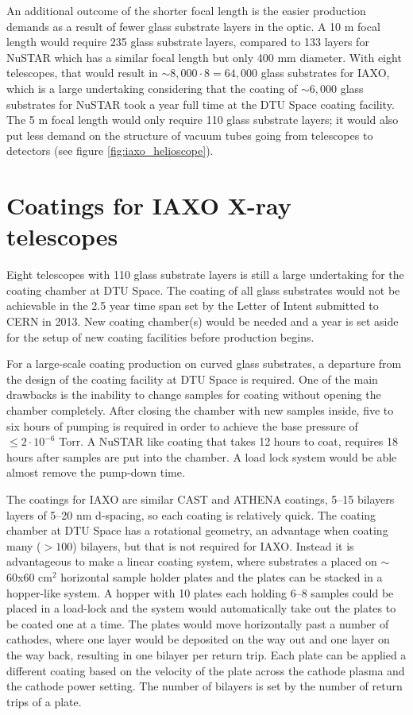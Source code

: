 An additional outcome of the shorter focal length is the easier production demands as a result of fewer glass substrate layers in the optic. A 10 m focal length would require 235 glass substrate layers, compared to 133 layers for NuSTAR which has a similar focal length but only 400 mm diameter. With eight telescopes, that would result in $\sim8,000\cdot8=64,000$ glass substrates for IAXO, which is a large undertaking considering that the coating of $\sim6,000$ glass substrates for NuSTAR took a year full time at the DTU Space coating facility. The 5 m focal length would only require 110 glass substrate layers; it would also put less demand on the structure of vacuum tubes going from telescopes to detectors (see figure \ref{fig:iaxo_helioscope}).

\section{Coatings for IAXO X-ray telescopes}
Eight telescopes with 110 glass substrate layers is still a large undertaking for the coating chamber at DTU Space. The coating of all glass substrates would not be achievable in the 2.5 year time span set by the Letter of Intent\cite{Irastorza:2013uu} submitted to CERN in 2013. New coating chamber(s) would be needed and a year is set aside for the setup of new coating facilities before production begins.

For a large-scale coating production on curved glass substrates, a departure from the design of the coating facility at DTU Space is required. One of the main drawbacks is the inability to change samples for coating without opening the chamber completely. After closing the chamber with new samples inside, five to six hours of pumping is required in order to achieve the base pressure of $\leq 2\cdot10^{-6}$ Torr. A NuSTAR like coating that takes 12 hours to coat, requires 18 hours after samples are put into the chamber. A load lock system would be able almost remove the pump-down time.

The coatings for IAXO are similar CAST and ATHENA coatings, 5--15 bilayers layers of 5--20 nm d-spacing, so each coating is relatively quick. The coating chamber at DTU Space has a rotational geometry, an advantage when coating many ($>100$) bilayers, but that is not required for IAXO. Instead it is advantageous to make a linear coating system, where substrates a placed on $\sim$60x60 cm$^2$ horizontal sample holder plates and the plates can be stacked in a hopper-like system. A hopper with 10 plates each holding 6--8 samples could be placed in a load-lock and the system would automatically take out the plates to be coated one at a time. The plates would move horizontally past a number of cathodes, where one layer would be deposited on the way out and one layer on the way back, resulting in one bilayer per return trip. Each plate can be applied a different coating based on the velocity of the plate across the cathode plasma and the cathode power setting. The number of bilayers is set by the number of return trips of a plate.

